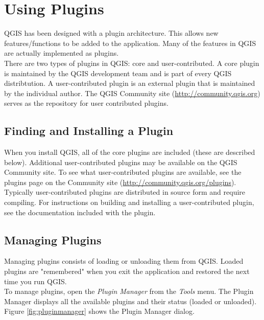 \section{Using Plugins}
QGIS has been designed with a plugin architecture. This allows new features/functions to be added to the application. Many of the features in QGIS are actually implemented as plugins.\\

There are two types of plugins in QGIS: core and user-contributed.
A core plugin is maintained by the QGIS development team and is part of every QGIS distribtution. A user-contributed plugin is an external plugin that is maintained by the individual author. The QGIS Community site (\url{http://community.qgis.org}) serves as the repository for user contributed plugins.

\subsection{Finding and Installing a Plugin}
When you install QGIS, all of the core plugins are included (these are described
below). Additional user-contributed plugins may be
available on the QGIS Community site. To see what user-contributed plugins are
available, see the plugins page on the Community site
(\url{http://community.qgis.org/plugins}).\\

Typically user-contributed plugins are distributed in source form and require compiling. For instructions on building and installing a user-contributed plugin, see the documentation included with the plugin.
\subsection{Managing Plugins}\label{sec:managing_plugins}
Managing plugins consists of loading or unloading them from QGIS. Loaded plugins are "remembered" when you exit the application and restored the next time you run QGIS.\\

To manage plugins, open the \textsl{Plugin Manager} from the \textsl{Tools}
menu. The Plugin Manager displays all the available plugins and their status (loaded or unloaded). Figure \ref{fig:pluginmanager} shows the Plugin Manager dialog.

